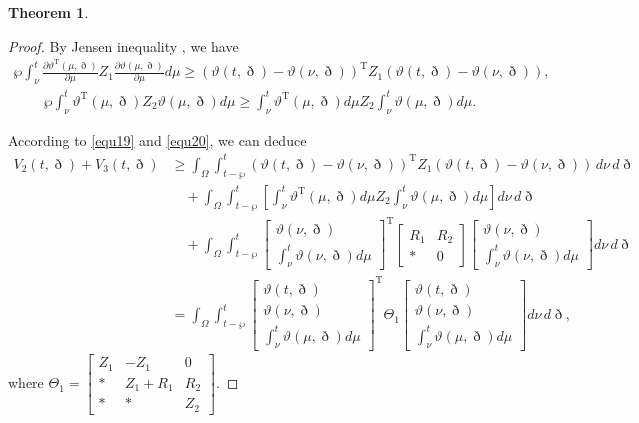 \documentclass[preprint,review,fleqn,sort&compress,3p]{elsarticle}
\theoremstyle{definition}%
\newtheorem{thm}{Theorem}[section]
\begin{document}
\begin{thm}
\begin{proof}
		By Jensen inequality \cite{zhang2022quasisynchronization}, we have
		\begin{align}\label{equ19}
			\wp \int_\nu^t \frac{\partial \vartheta^\text{T}(\mu, \eth)}{\partial \mu} Z_1 \frac{\partial \vartheta(\mu, \eth)}{\partial \mu} d\mu \geq (\vartheta(t, \eth) - \vartheta(\nu, \eth))^\text{T} Z_1 (\vartheta(t, \eth) - \vartheta(\nu, \eth)),
		\end{align}
		\begin{align}\label{equ20}
			\wp \int_\nu^t \vartheta^\text{T}(\mu, \eth) Z_2 \vartheta(\mu, \eth) d\mu \geq \int_\nu^t \vartheta^\text{T}(\mu, \eth) d\mu Z_2 \int_\nu^t \vartheta(\mu, \eth) d\mu. 
		\end{align}
		
		According to \eqref{equ19} and \eqref{equ20}, we can deduce
		\begin{align} 
			V_2(t, \eth) + V_3(t, \eth) &\geq \int_\Omega \int_{t - \wp}^t (\vartheta(t, \eth) - \vartheta(\nu, \eth))^\text{T} Z_1 (\vartheta(t, \eth) - \vartheta(\nu, \eth)) \, d\nu \, d\eth\nonumber\\
			&\quad + \int_\Omega \int_{t-\wp}^t \left[ \int_\nu^t \vartheta^\text{T}(\mu, \eth) d\mu Z_2 \int_\nu^t \vartheta(\mu, \eth) d\mu \right] d\nu \, d\eth\nonumber\\
			&\quad + \int_\Omega \int_{t-\wp}^t \begin{bmatrix} \vartheta(\nu,\eth) \\ \int_\nu^t \vartheta(\nu, \eth) d\mu \end{bmatrix} ^\text{T} \begin{bmatrix} R_1 & R_2 \\ * & 0 \end{bmatrix} \begin{bmatrix} \vartheta(\nu,\eth) \\ \int_\nu^t \vartheta(\nu, \eth) d\mu \end{bmatrix} d\nu \, d\eth\nonumber\\
			&= \int_\Omega \int_{t-\wp}^t \left[ \begin{array}{c} \vartheta(t, \eth) \\ \vartheta(\nu, \eth)\\\int_\nu^t \vartheta(\mu, \eth) d\mu \end{array} \right]^\text{T} \Theta_1 \left[ \begin{array}{c} \vartheta(t, \eth) \\ \vartheta(\nu, \eth)\\\int_\nu^t \vartheta(\mu, \eth) d\mu \end{array} \right] d\nu \, d\eth,
		\end{align}
		where $\Theta_1 = \begin{bmatrix}
			Z_1 & -Z_1 & 0 \\
			* & Z_1 + R_1 & R_2 \\
			* & * & Z_2
		\end{bmatrix} $.
		

\end{proof}
\end{thm}
\end{document}
